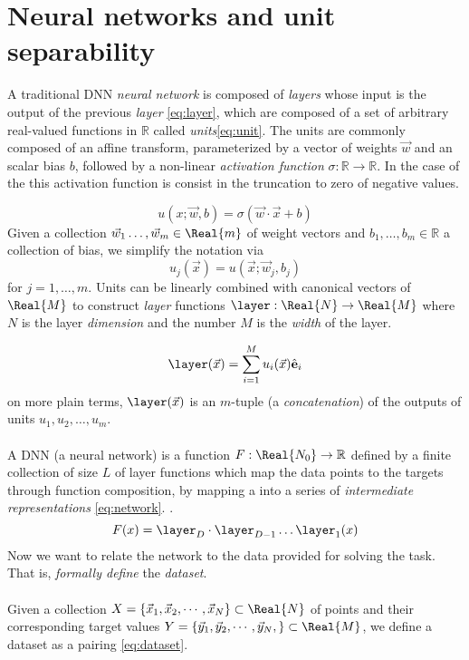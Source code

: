 \section{Neural networks and unit separability}\label{sec:separability}

A traditional DNN \emph{neural network} is composed of \emph{layers} whose input is the output of the previous \emph{layer} \ref{eq:layer}, which are composed of a set of arbitrary real-valued functions in $\mathbb{R}$ called \emph{units}\ref{eq:unit}. The units are commonly composed of an affine transform, parameterized by a vector of weights $\vec{w}$ and an scalar bias $b$, followed by a non-linear \emph{activation function} $\sigma : \mathbb{R}\rightarrow\mathbb{R}$. In the case of the \ReLU this activation function is consist in the truncation to zero of negative values.

\begin{equation}\label{eq:unit}
u(x; \vec{w}, b) = \sigma(\vec{w} \cdot \vec{x} + b)
\end{equation}
Given a collection $\vec{w}_1\ldots,\vec{w}_m\in\Real{m}$ of weight vectors and $b_1,\ldots,b_m\in\mathbb{R}$ a collection of bias, we simplify the notation via
\begin{equation}
    u_j(\vec{x}) = u(\vec{x};\vec{w}_j,b_j)
\end{equation}
for $j=1,\ldots,m$. Units can be linearly combined with canonical vectors of $\Real{M}$ to construct \emph{layer} functions $\layer:\Real{N}\rightarrow\Real{M}$ where $N$ is the layer \emph{dimension} and the number $M$ is the \emph{width} of the layer.

\begin{equation}\label{eq:layer}
\layer(\vec{x}) = \sum^M_{i=1} u_i(\vec{x}) \hat{\textbf{e}}_i
\end{equation}
on more plain terms, $\layer(\vec{x})$ is an $m$-tuple (a \emph{concatenation}) of the outputs of units $u_1,u_2,\ldots,u_m$.
\\\\
A DNN (a neural network) is a function $F:\Real{N_0}\rightarrow\mathbb{R}$ defined by a finite collection of size $L$ of layer functions which map the data points to the targets through function composition, by mapping a into a series of \emph{intermediate representations} \ref{eq:network}. \cite{ramachandranEtAl2017SearchingForActivationFunctions,eswaranSingh2015SomeTheoremsForFFNN}.
\begin{equation}\label{eq:network}
F(x) = \layer_D \cdot \layer_{D-1} \dots \layer_1(x) 
\end{equation}
Now we want to relate the network to the data provided for solving the task. That is, \emph{formally define} the \emph{dataset}. 
\\\\
Given a collection $X=\{\vec{x}_1,\vec{x}_2,\cdots,\vec{x}_N\} \subset \Real{N}$ of points and their corresponding target values $Y=\{\vec{y}_1,\vec{y}_2,\cdots,\vec{y}_N,\} \subset \Real{M}$, we define a dataset as a pairing \ref{eq:dataset}.

